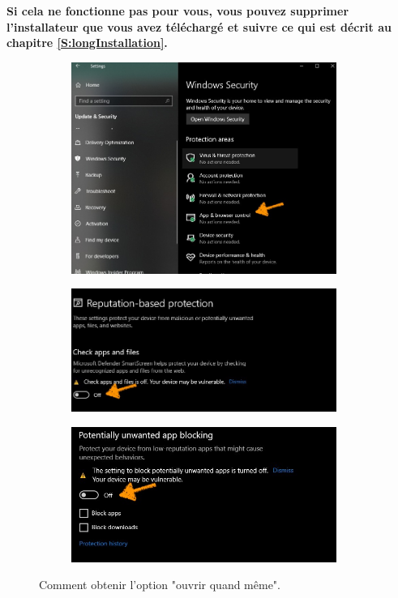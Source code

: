 \documentclass{article}
\begin{document}
\textbf{\color{Bittersweet}Si cela ne fonctionne pas pour vous, vous pouvez supprimer l'installateur que vous avez téléchargé et suivre ce qui est décrit au chapitre \ref{S:longInstallation}.}
 \begin{figure}[H]
\begin{subfigure}[c]{0.5\textwidth}
\includegraphics[width=0.95\textwidth]{Plots/Block1.jpeg}
\subcaption{ }
\end{subfigure}
\begin{subfigure}[c]{0.5\textwidth}
\includegraphics[width=0.95\textwidth]{Plots/Block2.jpeg}
\subcaption{ }
\end{subfigure}
\begin{subfigure}[c]{0.5\textwidth}
\includegraphics[width=0.95\textwidth]{Plots/Block3.jpeg}
\subcaption{ }
\end{subfigure}
\caption{Comment obtenir l'option "ouvrir quand même".\label{F:unblock}}
\end{figure}
\end{document}
